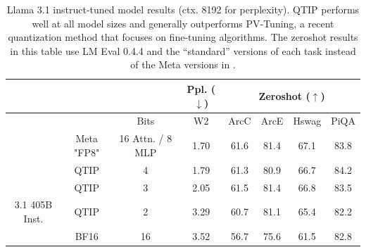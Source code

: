 \begin{table}[t]
\caption{Llama 3.1 instruct-tuned model results (ctx. 8192 for perplexity).  QTIP performs well at all model sizes and generally outperforms PV-Tuning, a recent quantization method that focuses on fine-tuning algorithms. The zeroshot results in this table use LM Eval 0.4.4 and the ``standard'' versions of each task instead of the Meta versions in \cite{llama3}.}
\label{tab:llama31}
\small\sc\centering\tabcolsep=0.1cm
\begin{tabular}{@{}cccccccc@{}}
                                                                             &                                                        &                                                   & Ppl. ($\downarrow$)                                 & \multicolumn{4}{c}{Zeroshot ($\uparrow$)} \\ \midrule
                                                                             & \multicolumn{1}{c|}{}                                  & \multicolumn{1}{c|}{Bits}                         & \multicolumn{1}{c|}{W2}                           & ArcC      & ArcE     & Hswag     & PiQA     \\ \midrule
\multicolumn{1}{c|}{}                                                        & \multicolumn{1}{c|}{Meta "FP8"}                        & \multicolumn{1}{c|}{16 Attn. / 8 MLP}             & \multicolumn{1}{c|}{1.70}                         & 61.6      & 81.4     & 67.1      & 83.8     \\
\multicolumn{1}{c|}{}                                                        & \multicolumn{1}{c|}{QTIP}                              & \multicolumn{1}{c|}{4}                            & \multicolumn{1}{c|}{1.79}                         & 61.3      & 80.9     & 66.7      & 84.2     \\
\multicolumn{1}{c|}{}                                                        & \multicolumn{1}{c|}{QTIP}                              & \multicolumn{1}{c|}{3}                            & \multicolumn{1}{c|}{2.05}                         & 61.5      & 81.4     & 66.8      & 83.5     \\
\multicolumn{1}{c|}{\multirow{-4}{*}{3.1 405B Inst.}}                        & \multicolumn{1}{c|}{QTIP}                              & \multicolumn{1}{c|}{2}                            & \multicolumn{1}{c|}{3.29}                         & 60.7      & 81.1     & 65.4      & 82.2     \\
\rowcolor[HTML]{D9D9D9} 
\multicolumn{1}{c|}{\cellcolor[HTML]{D9D9D9}}                                & \multicolumn{1}{c|}{\cellcolor[HTML]{D9D9D9}BF16}      & \multicolumn{1}{c|}{\cellcolor[HTML]{D9D9D9}16}   & \multicolumn{1}{c|}{\cellcolor[HTML]{D9D9D9}3.52} & 56.7      & 75.6     & 61.5      & 82.8     \\

\end{tabular}
\end{table}
